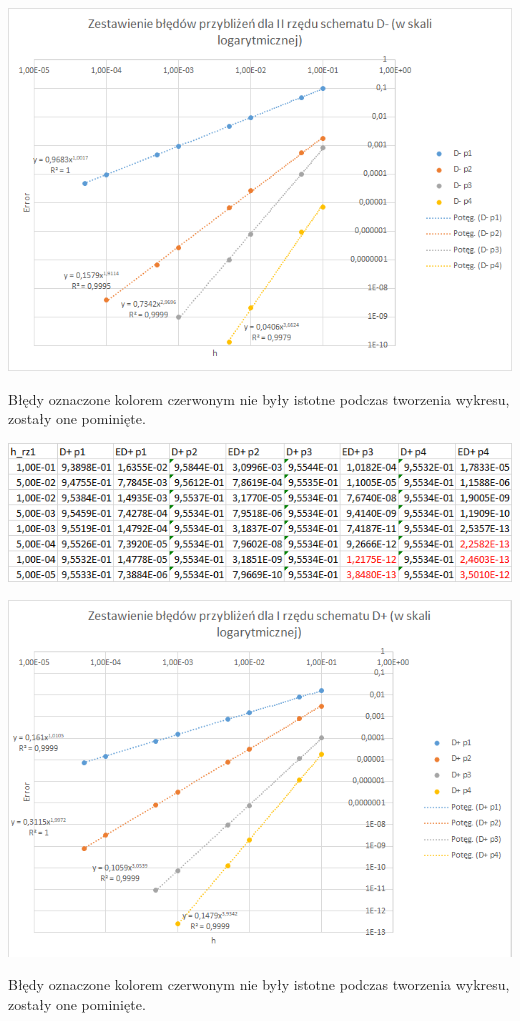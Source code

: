 \includegraphics{Lab2/charts/rz2_log_Db.png}
\newpage

Błędy oznaczone kolorem czerwonym nie były istotne podczas tworzenia wykresu, zostały one pominięte.

\includegraphics{Lab2/charts/rz1_log_Df_dane.png}

\includegraphics{Lab2/charts/rz1_log_Df.png}
\newpage

Błędy oznaczone kolorem czerwonym nie były istotne podczas tworzenia wykresu, zostały one pominięte.

